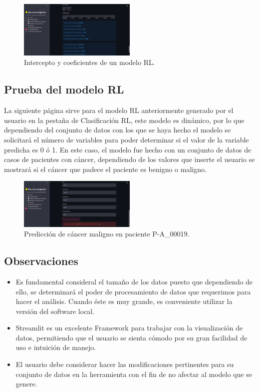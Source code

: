 \documentclass{article}
\begin{document}
\begin{figure}[!htb]
	\centering
	\includegraphics[width=0.5\textwidth]{figures/pagina-rl.png}
	\caption{Intercepto y coeficientes de un modelo RL.}
	\label{fig:pagina-rl}
\end{figure}

\subsection{Prueba del modelo RL}
\noindent La siguiente página sirve para el modelo RL anteriormente generado por el usuario en la pestaña de Clasificación RL, este modelo es dinámico, por lo que dependiendo del
conjunto de datos con los que se haya hecho el modelo se solicitará el número de variables para poder determinar si el valor de la variable predicha es 0 ó 1. En este caso,
el modelo fue hecho con un conjunto de datos de casos de pacientes con cáncer, dependiendo de los valores que inserte el usuario se mostrará si el cáncer que padece el paciente es
benigno o maligno.
\newline
\begin{figure}[!htb]
	\centering
	\includegraphics[width=0.5\textwidth]{figures/pagina-modelo-rl.png}
	\caption{Predicción de cáncer maligno en paciente P-A\_00019.}
	\label{fig:pagina-modelo-rl}
\end{figure}

\subsection{Observaciones}
\begin{itemize}
\item Es fundamental consideral el tamaño de los datos puesto que dependiendo de ello, se determinará el poder de procesamiento de datos que requerimos para hacer el análisis. Cuando éste 
es muy grande, es conveniente utilizar la versión del software local.
\item Streamlit es un excelente Framework para trabajar con la visualización de datos, permitiendo que el usuario se sienta cómodo por su gran facilidad de uso e intuición de manejo.
\item El usuario debe considerar hacer las modificaciones pertinentes para su conjunto de datos en la herramienta con el fin de no afectar al modelo que se genere.
\end{itemize}
\end{document}
